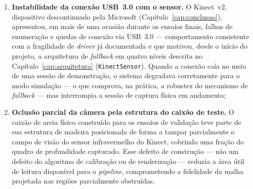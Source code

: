 \begin{enumerate}
    \item \textbf{Instabilidade da conexão USB~3.0 com o sensor.} O
          Kinect~v2, dispositivo descontinuado pela Microsoft
          (Capítulo~\ref{cap:conclusao}), apresentou, em mais de uma
          ocasião durante os ensaios finais, falhas de enumeração e
          quedas de conexão via USB~3.0 — comportamento consistente
          com a fragilidade de \textit{driver} já documentada e que
          motivou, desde o início do projeto, a arquitetura de
          \textit{fallback} em quatro níveis descrita no
          Capítulo~\ref{cap:arquitetura} (\texttt{KinectSensor}). Quando
          a conexão caía no meio de uma sessão de demonstração, o
          sistema degradava corretamente para o modo simulação — o
          que comprova, na prática, a robustez do mecanismo de
          \textit{fallback} — mas interrompia a sessão de captura
          física em andamento;
    \item \textbf{Oclusão parcial da câmera pela estrutura do caixão
          de teste.} O caixão de areia físico construído para os
          ensaios de validação teve parte de sua estrutura de madeira
          posicionada de forma a tampar parcialmente o campo de
          visão do sensor infravermelho do Kinect, cobrindo uma
          fração do quadro de profundidade capturado. Esse defeito de
          construção — não um defeito do algoritmo de calibração ou
          de renderização — reduzia a área útil de leitura disponível
          para o \textit{pipeline}, comprometendo a fidelidade da
          malha projetada nas regiões parcialmente obstruídas.
\end{enumerate}

